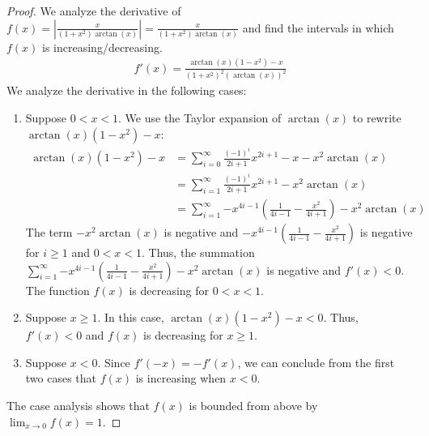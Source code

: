 \documentclass[10pt,a4paper]{amsart}
\newcommand{\taylorarctan}[3] {\sum_{i=#1}^{#2}\frac{(-1)^i}{2i+1                                                                                                                                                                                                                                                                                                                                                                                                                                                                       }{#3}^{2i+1}}
\begin{document}
\begin{proof}
We analyze the derivative of $f(x)=|\frac{x}{(1+x^2)\arctan(x)}|=\frac{x}{(1+x^2)\arctan(x)}$ and find the intervals in which $f(x)$ is increasing/decreasing. 
\begin{align*}
f'(x)=\frac{\arctan(x)(1-x^2)-x}{(1+x^2)^2(\arctan (x))^2}
\end{align*}
We analyze the derivative in the following cases:
\begin{enumerate}
\item
Suppose $0<x<1$. We use the Taylor expansion of $\arctan(x)$ to rewrite $\arctan(x)(1-x^2)-x$:
\begin{align*}
\arctan(x)(1-x^2)-x&=\taylorarctan{0}{\infty}{x}-x-x^2\arctan(x)\\
&=\taylorarctan{1}{\infty}{x}-x^2\arctan(x)\\
&=\sum_{i=1}^{\infty}{-x^{4i-1}(\frac{1}{4i-1}-\frac{x^2}{4i+1})}-x^2\arctan(x)
\end{align*}
The term $-x^2\arctan(x)$ is negative and $-x^{4i-1}(\frac{1}{4i-1}-\frac{x^2}{4i+1})$ is negative for $i\geq 1$ and $0<x<1$. Thus, the summation $\sum_{i=1}^{\infty}{-x^{4i-1}(\frac{1}{4i-1}-\frac{x^2}{4i+1})}-x^2\arctan(x)$ is negative and $f'(x)<0$. The function $f(x)$ is decreasing for $0<x<1$.
\item
Suppose $x\geq 1$. In this case, $\arctan(x)(1-x^2)-x<0$. Thus, $f'(x)<0$ and $f(x)$ is decreasing for $x\geq 1$.
\item
Suppose $x<0$. Since $f'(-x)=-f'(x)$, we can conclude from the first two cases that $f(x)$ is increasing when $x<0$.
\end{enumerate}
The case analysis shows that $f(x)$ is bounded from above by $\lim_{x\to 0}f(x)=1$.

\end{proof}
\end{document}
